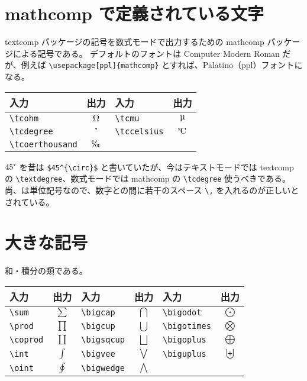 \section{mathcomp で定義されている文字}
textcomp パッケージの記号を数式モードで出力するための mathcomp パッケージによる記号である。
デフォルトのフォントは Computer Modern Roman だが、例えば \verb`\usepackage[ppl]{mathcomp}` とすれば、Palatino（ppl）フォントになる。
\begin{longtable}{@{}lclc@{}}
  入力                       & 出力             & 入力                     & 出力                \\ \toprule
  \verb`\tcohm`              & $\tcohm$         & \verb`\tcmu`             & $\tcmu$             \\
  \verb`\tcdegree`           & $\tcdegree$      & \verb`\tccelsius`        & $\tccelsius$        \\
  \verb`\tcoerthousand`      & $\tcperthousand$ &                          &                     \\
\end{longtable}
$45\tcdegree$ を昔は \verb`$45^{\circ}$` と書いていたが、今はテキストモードでは textcomp の \verb`\textdegree`、数式モードでは mathcomp の \verb`\tcdegree` 使うべきである。
尚、\textcelsius{}は単位記号なので、数字との間に若干のスペース \verb`\,` を入れるのが正しいとされている。
\section{大きな記号}
和・積分の類である。
\begin{longtable}{@{}lclclc@{}}
  入力           & 出力      & 入力             & 出力        & 入力              & 出力         \\ \toprule
  \verb`\sum`    & $\sum$    & \verb`\bigcap`   & $\bigcap$   & \verb`\bigodot`   & $\bigodot$   \\
  \verb`\prod`   & $\prod$   & \verb`\bigcup`   & $\bigcup$   & \verb`\bigotimes` & $\bigotimes$ \\
  \verb`\coprod` & $\coprod$ & \verb`\bigsqcup` & $\bigsqcup$ & \verb`\bigoplus`  & $\bigoplus$  \\
  \verb`\int`    & $\int$    & \verb`\bigvee`   & $\bigvee$   & \verb`\biguplus`  & $\biguplus$  \\
  \verb`\oint`   & $\oint$   & \verb`\bigwedge` & $\bigwedge$ &                   &              \\
\end{longtable}
